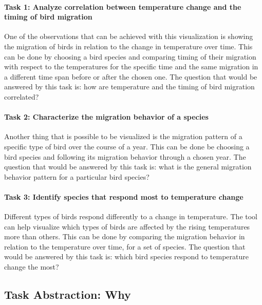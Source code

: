 \documentclass[journal]{vgtc}                %
\begin{document}
\paragraph{Task 1: Analyze correlation between temperature change and the timing of bird migration} One of the observations that can be achieved with this visualization is showing the migration of birds in relation to the change in temperature over time. This can be done by choosing a bird species and comparing timing of their migration with respect to the temperatures for the specific time and the same migration in a different time span before or after the chosen one.  The question that would be answered by this task is: how are temperature and the timing of bird migration correlated?

\paragraph{Task 2: Characterize the migration behavior of a species} Another thing that is possible to be visualized is the migration pattern of a specific type of bird over the course of a year. This can be done be choosing a bird species and following its migration behavior through a chosen year. The question that would be answered by this task is: what is the general migration behavior pattern for a particular bird species?

\paragraph{Task 3: Identify species that respond most to temperature change} Different types of birds respond differently to a change in temperature. The tool can help visualize which types of birds are affected by the rising temperatures more than others. This can be done by comparing the migration behavior in relation to the temperature over time, for a set of species. The question that would be answered by this task is: which bird species respond to temperature change the most?

\subsection{Task Abstraction: Why}

\end{document}
